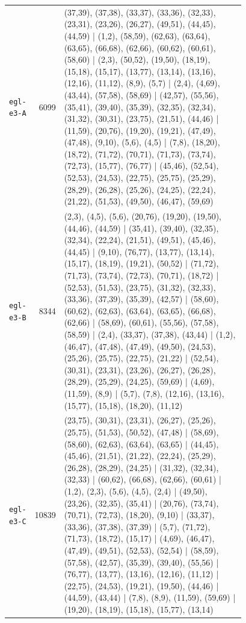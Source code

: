 \begin{landscape}
\begin{longtable}{lr>{\tiny\raggedright\arraybackslash}p{0.78\linewidth}}
\texttt{egl-e3-A} & 6099 & (37,39), (37,38), (33,37), (33,36), (32,33), (23,31), (23,26), (26,27), (49,51), (44,45), (44,59) | (1,2), (58,59), (62,63), (63,64), (63,65), (66,68), (62,66), (60,62), (60,61), (58,60) | (2,3), (50,52), (19,50), (18,19), (15,18), (15,17), (13,77), (13,14), (13,16), (12,16), (11,12), (8,9), (5,7) | (2,4), (4,69), (43,44), (57,58), (58,69) | (42,57), (55,56), (35,41), (39,40), (35,39), (32,35), (32,34), (31,32), (30,31), (23,75), (21,51), (44,46) | (11,59), (20,76), (19,20), (19,21), (47,49), (47,48), (9,10), (5,6), (4,5) | (7,8), (18,20), (18,72), (71,72), (70,71), (71,73), (73,74), (72,73), (15,77), (76,77) | (45,46), (52,54), (52,53), (24,53), (22,75), (25,75), (25,29), (28,29), (26,28), (25,26), (24,25), (22,24), (21,22), (51,53), (49,50), (46,47), (59,69) \\[2pt]
\texttt{egl-e3-B} & 8344 & (2,3), (4,5), (5,6), (20,76), (19,20), (19,50), (44,46), (44,59) | (35,41), (39,40), (32,35), (32,34), (22,24), (21,51), (49,51), (45,46), (44,45) | (9,10), (76,77), (13,77), (13,14), (15,17), (18,19), (19,21), (50,52) | (71,72), (71,73), (73,74), (72,73), (70,71), (18,72) | (52,53), (51,53), (23,75), (31,32), (32,33), (33,36), (37,39), (35,39), (42,57) | (58,60), (60,62), (62,63), (63,64), (63,65), (66,68), (62,66) | (58,69), (60,61), (55,56), (57,58), (58,59) | (2,4), (33,37), (37,38), (43,44) | (1,2), (46,47), (47,48), (47,49), (49,50), (24,53), (25,26), (25,75), (22,75), (21,22) | (52,54), (30,31), (23,31), (23,26), (26,27), (26,28), (28,29), (25,29), (24,25), (59,69) | (4,69), (11,59), (8,9) | (5,7), (7,8), (12,16), (13,16), (15,77), (15,18), (18,20), (11,12) \\[2pt]
\texttt{egl-e3-C} & 10839 & (23,75), (30,31), (23,31), (26,27), (25,26), (25,75), (51,53), (50,52), (47,48) | (58,69), (58,60), (62,63), (63,64), (63,65) | (44,45), (45,46), (21,51), (21,22), (22,24), (25,29), (26,28), (28,29), (24,25) | (31,32), (32,34), (32,33) | (60,62), (66,68), (62,66), (60,61) | (1,2), (2,3), (5,6), (4,5), (2,4) | (49,50), (23,26), (32,35), (35,41) | (20,76), (73,74), (70,71), (72,73), (18,20), (9,10) | (33,37), (33,36), (37,38), (37,39) | (5,7), (71,72), (71,73), (18,72), (15,17) | (4,69), (46,47), (47,49), (49,51), (52,53), (52,54) | (58,59), (57,58), (42,57), (35,39), (39,40), (55,56) | (76,77), (13,77), (13,16), (12,16), (11,12) | (22,75), (24,53), (19,21), (19,50), (44,46) | (44,59), (43,44) | (7,8), (8,9), (11,59), (59,69) | (19,20), (18,19), (15,18), (15,77), (13,14) \\[2pt]

\end{longtable}
\end{landscape}

